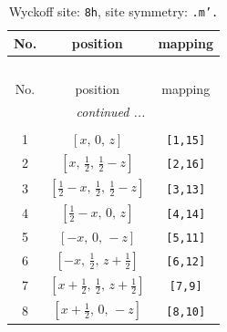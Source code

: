 \documentclass[fleqn,8pt]{jsarticle}
\begin{document}
\begin{longtable}{ccc}
\caption{Wyckoff site: {\tt 8h}, site symmetry: {\tt .m'.}}
 \\
 \hline \hline
No. & position & mapping \\ \hline \endfirsthead

\multicolumn{2}{l}{\tablename\ \thetable{}} \\
 \hline \hline
No. & position & mapping \\ \hline \endhead

 \hline \hline
\multicolumn{2}{r}{\footnotesize\it continued ...} \\ \endfoot

 \hline \hline
\multicolumn{2}{r}{} \\ \endlastfoot

1 & $\left[ x,\, 0,\, z \right]$ & {\tt [1,15]} \\ \hline
2 & $\left[ x,\, \frac{1}{2},\, \frac{1}{2} - z \right]$ & {\tt [2,16]} \\ \hline
3 & $\left[ \frac{1}{2} - x,\, \frac{1}{2},\, \frac{1}{2} - z \right]$ & {\tt [3,13]} \\ \hline
4 & $\left[ \frac{1}{2} - x,\, 0,\, z \right]$ & {\tt [4,14]} \\ \hline
5 & $\left[ - x,\, 0,\, - z \right]$ & {\tt [5,11]} \\ \hline
6 & $\left[ - x,\, \frac{1}{2},\, z + \frac{1}{2} \right]$ & {\tt [6,12]} \\ \hline
7 & $\left[ x + \frac{1}{2},\, \frac{1}{2},\, z + \frac{1}{2} \right]$ & {\tt [7,9]} \\ \hline
8 & $\left[ x + \frac{1}{2},\, 0,\, - z \right]$ & {\tt [8,10]} \\
\end{longtable}
\renewcommand{\arraystretch}{1.2}
\end{document}
